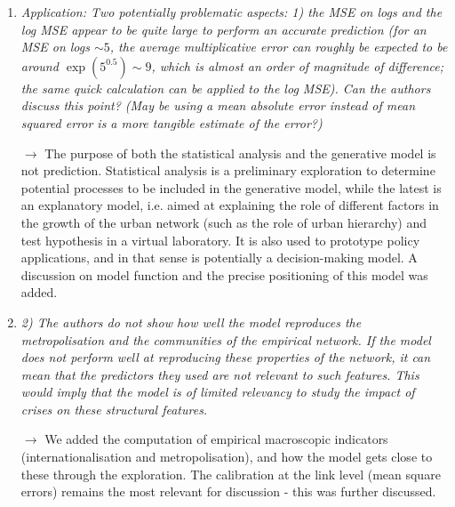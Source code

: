 \documentclass[10pt,a4paper,sans]{moderncv}
\begin{document}
\begin{enumerate}
	\medskip


	\item \textit{Application: Two potentially problematic aspects: 1) the MSE on logs and the log MSE appear to be quite large to perform an accurate prediction (for an MSE on logs $\sim 5$, the average multiplicative error can roughly be expected to be around $\exp(5^0.5) \sim 9$, which is almost an order of magnitude of difference; the same quick calculation can be applied to the log MSE). Can the authors discuss this point? (May be using a mean absolute error instead of mean squared error is a more tangible estimate of the error?)}
	
	$\rightarrow$ The purpose of both the statistical analysis and the generative model is not prediction. Statistical analysis is a preliminary exploration to determine potential processes to be included in the generative model, while the latest is an explanatory model, i.e. aimed at explaining the role of different factors in the growth of the urban network (such as the role of urban hierarchy) and test hypothesis in a virtual laboratory. It is also used to prototype policy applications, and in that sense is potentially a decision-making model. A discussion on model function and the precise positioning of this model was added.
	
	\medskip
	
	\item \textit{2) The authors do not show how well the model reproduces the metropolisation and the communities of the empirical network. If the model does not perform well at reproducing these properties of the network, it can mean that the predictors they used are not relevant to such features. This would imply that the model is of limited relevancy to study the impact of crises on these structural features.}
	
	$\rightarrow$ We added the computation of empirical macroscopic indicators (internationalisation and metropolisation), and how the model gets close to these through the exploration. The calibration at the link level (mean square errors) remains the most relevant for discussion - this was further discussed.
	
	\medskip



\end{enumerate}
\end{document}
